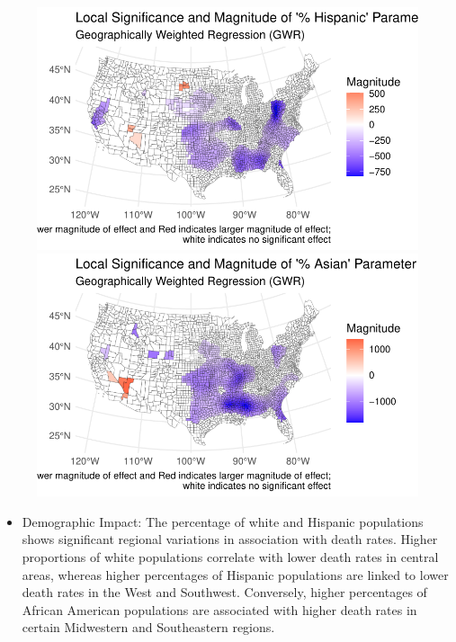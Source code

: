 \documentclass[
]{article}
\providecommand{\tightlist}{%
  \setlength{\itemsep}{0pt}\setlength{\parskip}{0pt}}\usepackage{longtable,booktabs,array}
\begin{document}
\begin{figure}
\begin{minipage}{0.50\linewidth}
\includegraphics{report_files/figure-pdf/unnamed-chunk-4-3.pdf}\end{minipage}%
%
\begin{minipage}{0.50\linewidth}
\includegraphics{report_files/figure-pdf/unnamed-chunk-4-4.pdf}\end{minipage}%

\end{figure}%

\begin{itemize}
\tightlist
\item
  Demographic Impact: The percentage of white and Hispanic populations
  shows significant regional variations in association with death rates.
  Higher proportions of white populations correlate with lower death
  rates in central areas, whereas higher percentages of Hispanic
  populations are linked to lower death rates in the West and Southwest.
  Conversely, higher percentages of African American populations are
  associated with higher death rates in certain Midwestern and
  Southeastern regions.
\end{itemize}
\end{document}
